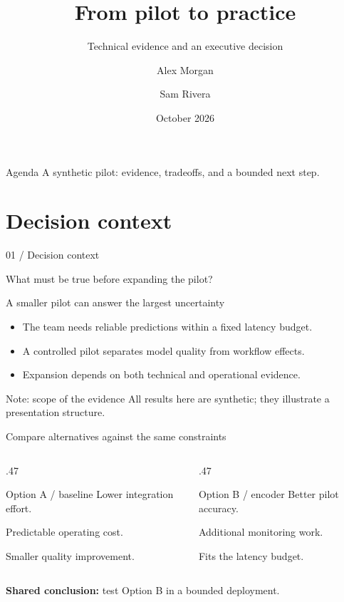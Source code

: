 \documentclass[11pt,aspectratio=169]{beamer}
\title[From pilot to practice]{From pilot to practice}
\subtitle{Technical evidence and an executive decision}
\author{Alex Morgan \and Sam Rivera}
\institute{Tempus Research Lab}
\date{October 2026}
\begin{document}
\begin{frame}[plain]
  \titlepage
\end{frame}
\begin{frame}{Agenda}
  \tableofcontents
  \bigskip
  \textcolor{TempusMuted}{A synthetic pilot: evidence, tradeoffs, and a bounded next step.}
\end{frame}
\section{Decision context}
\begin{frame}[plain]
  \reportlogomark\par\bigskip
  {\textcolor{TempusAccent}{01 / Decision context}}\par
  \medskip What must be true before expanding the pilot?
\end{frame}
\begin{frame}{A smaller pilot can answer the largest uncertainty}
  \begin{itemize}[<+->]
    \item The team needs reliable predictions within a fixed latency budget.
    \item A controlled pilot separates model quality from workflow effects.
    \item Expansion depends on both technical and operational evidence.
  \end{itemize}
  \begin{block}{Note: scope of the evidence}
    All results here are synthetic; they illustrate a presentation structure.
  \end{block}
\end{frame}
\begin{frame}{Compare alternatives against the same constraints}
  \begin{columns}[T,onlytextwidth]
    \begin{column}{.47\textwidth}
      \begin{block}{Option A / baseline}
        Lower integration effort.\par\medskip
        Predictable operating cost.\par\medskip
        Smaller quality improvement.
      \end{block}
    \end{column}
    \begin{column}{.47\textwidth}
      \begin{exampleblock}{Option B / encoder}
        Better pilot accuracy.\par\medskip
        Additional monitoring work.\par\medskip
        Fits the latency budget.
      \end{exampleblock}
    \end{column}
  \end{columns}
  \medskip\textbf{Shared conclusion:} test Option B in a bounded deployment.
\end{frame}
\end{document}
